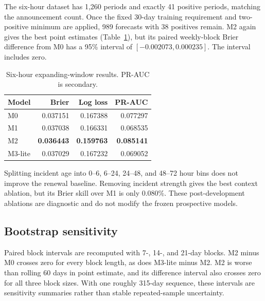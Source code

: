 The six-hour dataset has 1,260 periods and exactly 41 positive periods, matching the announcement
count. Once the fixed 30-day training requirement and two-positive minimum are applied, 989
forecasts with 38 positives remain. M2 again gives the best point estimates
(Table~\ref{tab:sixhour}), but its paired weekly-block Brier difference from M0 has a 95\% interval
of $[-0.002073,0.000235]$. The interval includes zero.

\begin{table}[h]
\centering
\caption{Six-hour expanding-window results. PR-AUC is secondary.}
\label{tab:sixhour}
\begin{tabular}{lrrr}
\toprule
Model & Brier & Log loss & PR-AUC \\
\midrule
M0 & 0.037151 & 0.167388 & 0.077297 \\
M1 & 0.037038 & 0.166331 & 0.068535 \\
M2 & \textbf{0.036443} & \textbf{0.159763} & \textbf{0.085141} \\
M3-lite & 0.037029 & 0.167232 & 0.069052 \\
\bottomrule
\end{tabular}
\end{table}

Splitting incident age into 0--6, 6--24, 24--48, and 48--72 hour bins does not improve the
renewal baseline. Removing incident strength gives the best context ablation, but its Brier skill
over M1 is only 0.080\%. These post-development ablations are diagnostic and do not modify the
frozen prospective models.

\subsection{Bootstrap sensitivity}

Paired block intervals are recomputed with 7-, 14-, and 21-day blocks. M2 minus M0 crosses zero for
every block length, as does M3-lite minus M2. M2 is worse than rolling 60 days in point estimate, and
its difference interval also crosses zero for all three block sizes. With one roughly 315-day
sequence, these intervals are sensitivity summaries rather than stable repeated-sample uncertainty.
